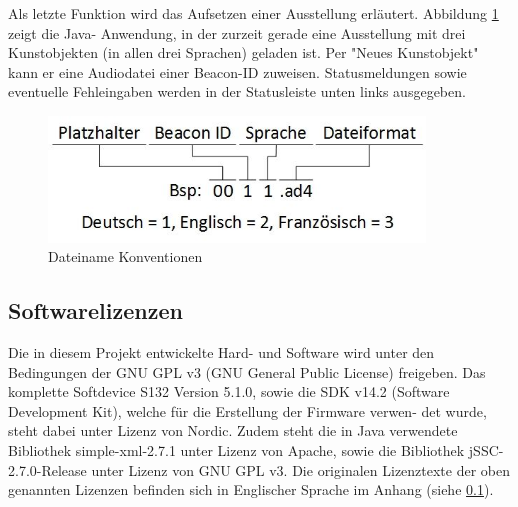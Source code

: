 Als letzte Funktion wird das Aufsetzen einer Ausstellung erläutert. Abbildung \ref{fig:soft_6} zeigt die Java- Anwendung, in der zurzeit gerade eine Ausstellung mit drei Kunstobjekten (in allen drei Sprachen) geladen ist. Per "Neues Kunstobjekt" kann er eine Audiodatei einer Beacon-ID zuweisen. Statusmeldungen sowie eventuelle Fehleingaben werden in der Statusleiste unten links ausgegeben.
\begin{figure}[h]
	\centering
	\includegraphics[width=10cm]{graphics/Dateiname_Konvention.jpeg}
	\caption{Dateiname Konventionen}
	\label{fig:soft_6}
\end{figure}

\subsection{Softwarelizenzen}
Die in diesem Projekt entwickelte Hard- und Software wird unter den Bedingungen der GNU
GPL v3 (GNU General Public License) freigeben. Das komplette Softdevice S132 Version 5.1.0,
sowie die SDK v14.2 (Software Development Kit), welche für die Erstellung der Firmware verwen-
det wurde, steht dabei unter Lizenz von Nordic. Zudem steht die in Java verwendete Bibliothek
simple-xml-2.7.1 unter Lizenz von Apache, sowie die Bibliothek jSSC-2.7.0-Release unter Lizenz
von GNU GPL v3.
Die originalen Lizenztexte der oben genannten Lizenzen befinden sich in Englischer Sprache
im Anhang (siehe \ref{}).

\clearpage












